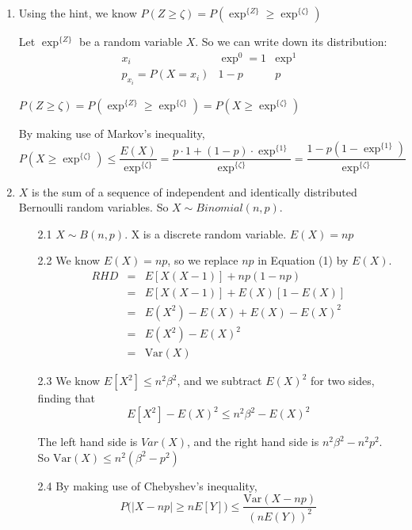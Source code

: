 \documentclass[12pt,thmsa]{article}
\begin{document}
\begin{enumerate}
\item Using the hint, we know $P(Z \geq  \zeta) = P (\exp^{\{Z\}}\geq \exp^{\{\zeta\}})$

Let $\exp^{\{Z\}}$ be a random variable $X$. So we can write down its distribution:
$$
\begin{array}{c|cc}
x_i & \exp^{0}=1 & \exp^{1}\\
\hline
p_{x_i}  = P(X=x_i) & 1-p & p 
\end{array}
$$

$P(Z \geq  \zeta) = P (\exp^{\{Z\}}\geq \exp^{\{\zeta\}})= P(X \geq \exp^{\{\zeta\}})$

By making use of Markov's inequality,
 \begin{equation*}
P(X \geq \exp^{\{\zeta\}}) \leq \frac{E(X)}{\exp^{\{\zeta\}}} = \frac{p\cdot1+(1-p)\cdot \exp^{\{1\}}}{\exp^{\{\zeta\}}}=\frac{1-p(1-\exp^{\{1\}})}{\exp^{\{\zeta\}}}
\end{equation*}

\item $X$ is the sum of a sequence of independent and identically distributed Bernoulli random variables. So $X \sim Binomial(n,p)$.

\begin{itemize}
 \item[2.1] $X \sim B(n,p)$. X is a discrete random variable. $E(X)=np$
\item[2.2] We know $E(X)=np$, so we replace $np$ in Equation (1) by $E(X)$.
  \begin{eqnarray*}
RHD &=& E[X(X-1)]+np(1-np)\\
&=& E[X(X-1)]+E(X)[1-E(X)] \\
&=& E(X^2)-E(X)+E(X)-E(X)^2\\
&=& E(X^2)-E(X)^2 \\
&=& \text{Var}(X)
\end{eqnarray*}

\item[2.3] We know $E[X^2]\leq n^2\beta^2$, and we subtract $E(X)^2$ for two sides, finding that
$$E[X^2]-E(X)^2\leq n^2\beta^2-E(X)^2$$

The left hand side is $Var(X)$, and the right hand side is $n^2\beta^2-n^2p^2$. \\
So $\text{Var}(X) \leq n^2(\beta^2 -p^2)$

\item[2.4] By making use of Chebyshev's inequality,
$$  P\Big( \vert X-np \vert \geq nE[Y] \Big)  \leq  \frac{\text{Var}(X-np)}{(nE(Y))^2}$$


\end{itemize}
\end{enumerate}
\end{document}
